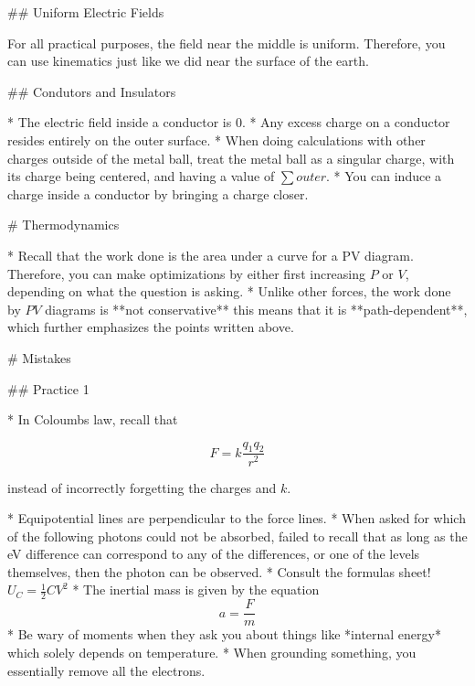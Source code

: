 \documentclass{article}
\begin{document}
\begin{markdown}
## Uniform Electric Fields

For all practical purposes, the field near the middle is uniform. Therefore, you can use kinematics just like we did near the surface of the earth.

## Condutors and Insulators

* The electric field inside a conductor is $0$.
* Any excess charge on a conductor resides entirely on the outer surface.
* When doing calculations with other charges outside of the metal ball, treat the metal ball as a singular charge, with its charge being centered, and having a value of $\sum outer$.
* You can induce a charge inside a conductor by bringing a charge closer. 

# Thermodynamics

* Recall that the work done is the area under a curve for a PV diagram. Therefore, you can make optimizations by either first increasing $P$ or $V$, depending on what the question is asking.
* Unlike other forces, the work done by $PV$ diagrams is **not conservative** this means that it is **path-dependent**, which further emphasizes the points written above.

# Mistakes

## Practice 1

* In Coloumbs law, recall that

\end{markdown}

$$
F = k\frac{q_1 q_2}{r^2}
$$

\begin{markdown}

instead of incorrectly forgetting the charges and $k$.

* Equipotential lines are perpendicular to the force lines.
* When asked for which of the following photons could not be absorbed, failed to recall that as long as the eV difference can correspond to any of the differences, or one of the levels themselves, then the photon can be observed.
* Consult the formulas sheet! $U_C = \frac{1}{2}CV^2$
* The inertial mass is given by the equation $$a = \frac{F}{m}$$
* Be wary of moments when they ask you about things like *internal energy* which solely depends on temperature.
* When grounding something, you essentially remove all the electrons.

\end{markdown}
\end{document}
